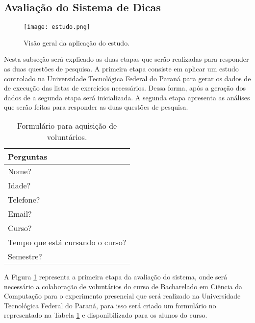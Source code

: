 \subsection{Avaliação do Sistema de Dicas}

\begin{figure}[ht]
	\captionsetup{justification=centering}
	\texttt{[image: estudo.png]}
	\caption{Visão geral da aplicação do estudo.}
	\label{figura:estudo}
\end{figure}

Nesta subseção será explicado as duas etapas que serão realizadas para responder as duas questões de pesquisa. A primeira etapa consiste em aplicar um estudo controlado na Universidade Tecnológica Federal do Paraná para gerar os dados de  de execução das listas de exercícios necessários. Dessa forma, após a geração dos dados de  a segunda etapa será inicializada. A segunda etapa apresenta as análises que serão feitas para responder as duas questões de pesquisa.

\begin{table}[]
	\centering
	\captionsetup{justification=centering}
	\caption{Formulário para aquisição de voluntários.}
	\label{tabela:formulário}
	\begin{tabular}{l}
		\hline
		Perguntas                        \\ \hline
		Nome?                            \\
		Idade?                           \\
		Telefone?                        \\
		Email?                           \\
		Curso?                           \\
		Tempo que está cursando o curso? \\
		Semestre?                        \\ \hline
	\end{tabular}
\end{table}

A Figura \ref{figura:estudo} representa a primeira etapa da avaliação do sistema, onde será necessário a colaboração de voluntários do curso de Bacharelado em Ciência da Computação para o experimento presencial que será realizado na Universidade Tecnológica Federal do Paraná, para isso será criado um formulário no  representado na Tabela \ref{tabela:formulário} e disponibilizado  para os alunos do curso.

